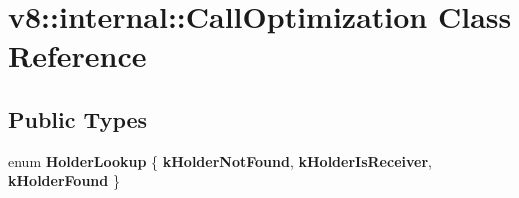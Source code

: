 \hypertarget{classv8_1_1internal_1_1CallOptimization}{}\section{v8\+:\+:internal\+:\+:Call\+Optimization Class Reference}
\label{classv8_1_1internal_1_1CallOptimization}
\subsection*{Public Types}
\begin{DoxyCompactItemize}
\item 
\mbox{\label{classv8_1_1internal_1_1CallOptimization_a0e0a49814579066e63f71cde5caa02db}} 
enum {\bfseries Holder\+Lookup} \{ {\bfseries k\+Holder\+Not\+Found}, 
{\bfseries k\+Holder\+Is\+Receiver}, 
{\bfseries k\+Holder\+Found}
 \}
\end{DoxyCompactItemize}
